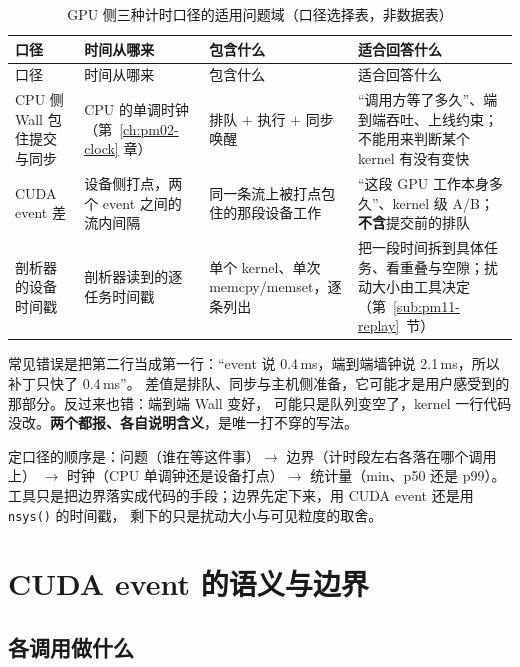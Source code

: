 \documentclass[12pt,a4paper,fontset=fandol]{ctexbook}
\newcommand{\Fn}[1]{\texttt{#1()}}
\newcommand{\Lang}[1]{\textsf{#1}}
\newcommand{\MWall}{\Lang{Wall}}
\newcommand{\Mx}[1]{\textsf{#1}}
\begin{document}
\begin{longtable}{>{\raggedright\arraybackslash}p{}
                  >{\raggedright\arraybackslash}p{}
                  >{\raggedright\arraybackslash}p{}
                  >{\raggedright\arraybackslash}p{}}
\caption{GPU 侧三种计时口径的适用问题域（口径选择表，非数据表）}\label{tab:pm11-scope}\\
\toprule
口径 & 时间从哪来 & 包含什么 & 适合回答什么 \\
\midrule
\endfirsthead
\toprule
口径 & 时间从哪来 & 包含什么 & 适合回答什么 \\
\midrule
\endhead
\bottomrule
\endfoot
CPU 侧 \MWall{} 包住提交与同步 &
CPU 的单调时钟（第~\ref{ch:pm02-clock} 章） &
排队 $+$ 执行 $+$ 同步唤醒 &
``调用方等了多久''、端到端吞吐、上线约束；不能用来判断某个 kernel 有没有变快 \\
CUDA event 差 &
设备侧打点，两个 event 之间的流内间隔 &
同一条流上被打点包住的那段设备工作 &
``这段 GPU 工作本身多久''、kernel 级 A/B；\textbf{不含}提交前的排队 \\
剖析器的设备时间戳 &
剖析器读到的逐任务时间戳 &
单个 kernel、单次 memcpy/memset，逐条列出 &
把一段时间拆到具体任务、看重叠与空隙；扰动大小由工具决定（第~\ref{sub:pm11-replay}~节） \\
\end{longtable}

常见错误是把第二行当成第一行：``event 说 0.4\,ms，端到端墙钟说 2.1\,ms，所以补丁只快了 0.4\,ms''。
差值是排队、同步与主机侧准备，它可能才是用户感受到的那部分。反过来也错：端到端 \MWall{} 变好，
可能只是队列变空了，kernel 一行代码没改。\textbf{两个都报、各自说明含义}，是唯一打不穿的写法。

\begin{guideline}[title={要点：先选口径，再选工具}]
\label{box:pm11-guideline-scope}
定口径的顺序是：问题（谁在等这件事）$\rightarrow$ 边界（计时段左右各落在哪个调用上）
$\rightarrow$ 时钟（CPU 单调钟还是设备打点）$\rightarrow$ 统计量（min、\Mx{p50} 还是 \Mx{p99}）。
工具只是把边界落实成代码的手段；边界先定下来，用 CUDA event 还是用 \Fn{nsys} 的时间戳，
剩下的只是扰动大小与可见粒度的取舍。
\end{guideline}

\section{CUDA event 的语义与边界}
\label{sec:pm11-event}

\subsection{各调用做什么}
\label{sub:pm11-event-api}
\end{document}
